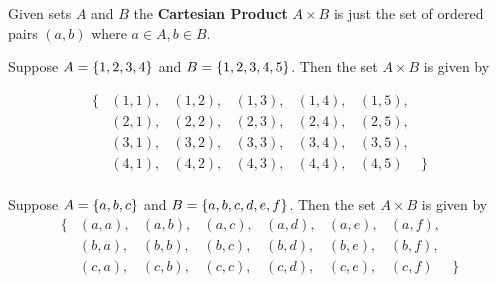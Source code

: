\documentclass[10pt]{beamer}
\begin{document}
\begin{frame}
\footnotesize 
\begin{myredbox}[title=Reminder of Definition]
Given sets $A$ and $B$ the \textbf{Cartesian Product} $A \times B$ is just the set of ordered pairs $(a,b)$ where $a \in A, b \in B$.
\end{myredbox}

\vfill 
\begin{mygreenbox}[title=Example]
Suppose $A=\{ {1,2,3,4} \}$ and $B=\{ {1,2,3,4,5} \}$.  Then the set $A \times B$ is given by 


    \[
    \begin{array}{ccccccc}
        \bigg\{ & (1,1), & (1,2), & (1,3), & (1,4), & (1,5),& \\
        & (2,1), & (2,2), & (2,3), & (2,4), & (2,5), &\\
        &(3,1), & (3,2), & (3,3), & (3,4), & (3,5), &\\
        &(4,1), & (4,2), & (4,3), & (4,4), & (4,5) & \bigg\} \\
    \end{array}
    \]
\end{mygreenbox}

\vfill 
\begin{mygreenbox}[title=Example]
Suppose $A=\{ {a,b,c} \}$ and $B=\{ {a,b,c,d,e,f} \}$.  Then the set $A \times B$ is given by 
   \[
    \begin{array}{cccccccc}
         \bigg\{ &  (a,a), & (a,b), & (a,c), & (a,d), & (a,e), & (a,f), & \\
        & (b,a), & (b,b), & (b,c), & (b,d), & (b,e), & (b,f), & \\
        & (c,a), & (c,b), & (c,c), & (c,d), & (c,e), & (c,f) & \bigg\} \\

    \end{array}
    \]
 \end{mygreenbox}
\end{frame}
\end{document}
